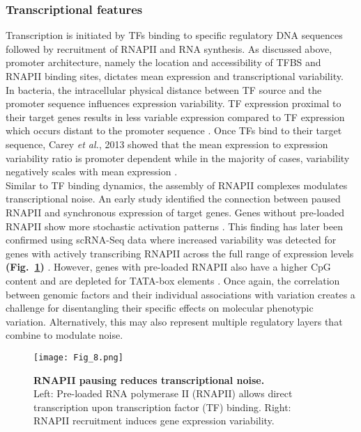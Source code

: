 \subsubsection{Transcriptional features}

Transcription is initiated by TFs binding to specific regulatory DNA sequences followed by recruitment of RNAPII and RNA synthesis. 
As discussed above, promoter architecture, namely the location and accessibility of TFBS and RNAPII binding sites, dictates mean expression and transcriptional variability. \\

In bacteria, the intracellular physical distance between TF source and the promoter sequence influences expression variability. 
TF expression proximal to their target genes results in less variable expression compared to TF expression which occurs distant to the promoter sequence \citep{Goni-Moreno2017}. 
Once TFs bind to their target sequence, Carey \emph{et al.}, 2013 showed that the mean expression to expression variability ratio is promoter dependent while in the majority of cases, variability negatively scales with mean expression \citep{Carey2013}. \\

Similar to TF binding dynamics, the assembly of RNAPII complexes modulates transcriptional noise. 
An early study identified the connection between paused RNAPII and synchronous expression of target genes. 
Genes without pre-loaded RNAPII show more stochastic activation patterns \citep{Boettiger2009}. 
This finding has later been confirmed using scRNA-Seq data where increased variability was detected for genes with actively transcribing RNAPII across the full range of expression levels \textbf{(Fig.~\ref{fig0:RNAPII})} \citep{Day2016}.
However, genes with pre-loaded RNAPII also have a higher CpG content and are depleted for TATA-box elements \cite{Day2016}. 
Once again, the correlation between genomic factors and their individual associations with variation creates a challenge for disentangling their specific effects on molecular phenotypic variation.
Alternatively, this may also represent multiple regulatory layers that combine to modulate noise. \\

\begin{figure}[!h]
\centering
\texttt{[image: Fig\_8.png]}
\caption[RNAPII pausing reduces transcriptional noise]{\textbf{RNAPII pausing reduces transcriptional noise.}\\
Left: Pre-loaded RNA polymerase II (RNAPII) allows direct transcription upon transcription factor (TF) binding. 
Right: RNAPII recruitment induces gene expression variability.}
\label{fig0:RNAPII}
\end{figure} 

